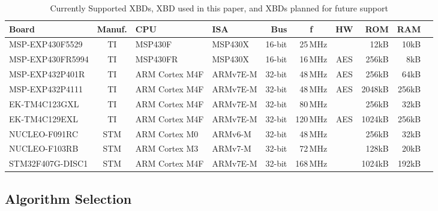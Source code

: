 \documentclass[10pt]{article}
\newcommand{\thb}[1]{\multicolumn{1}{c}{\textbf{#1}}}
\begin{document}
\begin{table}[ht]
  \caption{Currently Supported XBDs, {\color{blue}XBD used in this paper}, and {\color{purple}XBDs planned for future support}}\label{tab:XBDs}
    \begin{tabular}{l|c|ll|rrc|rr|r}
    \textbf{Board}   & \textbf{Manuf.}&\textbf{CPU}&\textbf{ISA}&\textbf{Bus}&\thb{f}&\textbf{HW}&\textbf{ROM}&\textbf{RAM} \\ \hline
    MSP-EXP430F5529  & TI        & MSP430F        &  MSP430X    & 16-bit &  25\,MHz &     &   12kB &  10kB  \\
    MSP-EXP430FR5994 & TI        & MSP430FR       &  MSP430X    & 16-bit &  16\,MHz & AES &  256kB &   8kB  \\
    MSP-EXP432P401R  & TI        & ARM Cortex M4F &  ARMv7E-M   & 32-bit &  48\,MHz & AES &  256kB &  64kB  \\
    \color{purple}MSP-EXP432P4111  & TI        & ARM Cortex M4F &  ARMv7E-M   & 32-bit &  48\,MHz & AES & 2048kB & 256kB  \\
    \color{blue}EK-TM4C123GXL    & TI        & ARM Cortex M4F &  ARMv7E-M   & 32-bit &  80\,MHz &     &  256kB &  32kB  \\ 
    EK-TM4C129EXL    & TI        & ARM Cortex M4F &  ARMv7E-M   & 32-bit & 120\,MHz & AES & 1024kB & 256kB  \\ 
    NUCLEO-F091RC    & STM       & ARM Cortex M0  &  ARMv6-M    & 32-bit &  48\,MHz &     &  256kB &  32kB  \\
    NUCLEO-F103RB    & STM       & ARM Cortex M3  &  ARMv7-M    & 32-bit &  72\,MHz &     &  128kB &  20kB  \\
    \color{purple}STM32F407G-DISC1 & STM       & ARM Cortex M4F &  ARMv7E-M   & 32-bit & 168\,MHz &     & 1024kB & 192kB  \\
    \end{tabular}
\end{table}


\subsection{Algorithm Selection}
\end{document}
